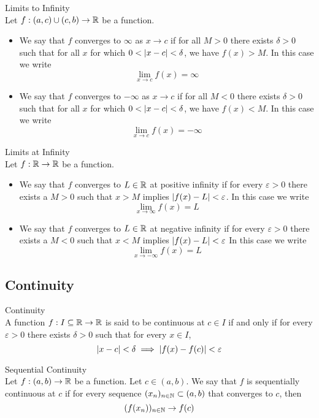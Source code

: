 \documentclass[a4paper]{article}
\begin{document}
\begin{defn}{Limits to Infinity}{}\\ Let $f:(a,c)\cup(c,b)\to\mathbb{R}$ be a function. 
\begin{itemize} 
\item We say that $f$ converges to $\infty$ as $x\to c$ if for all $M>0$ there exists $\delta>0$ such that for all $x$ for which $0<\abs{x-c}<\delta$, we have $f(x)>M$. In this case we write $$\lim_{x\to c}f(x)=\infty$$
\item We say that $f$ converges to $-\infty$ as $x\to c$ if for all $M<0$ there exists $\delta>0$ such that for all $x$ for which $0<\abs{x-c}<\delta$, we have $f(x)<M$. In this case we write $$\lim_{x\to c}f(x)=-\infty$$
\end{itemize}
\end{defn}

\begin{defn}{Limits at Infinity}{}\\ Let $f:\mathbb{R}\to\mathbb{R}$ be a function. 
\begin{itemize} 
\item We say that $f$ converges to $L\in\mathbb{R}$ at positive infinity if for every $\varepsilon>0$ there exists a $M>0$ such that $x>M$ implies $\abs{f(x)-L}<\varepsilon$. In this case we write $$\lim_{x\to\infty}f(x)=L$$
\item We say that $f$ converges to $L\in\mathbb{R}$ at negative infinity if for every $\varepsilon>0$ there exists a $M<0$ such that $x<M$ implies $\abs{f(x)-L}<\varepsilon$ In this case we write $$\lim_{x\to-\infty}f(x)=L$$
\end{itemize}
\end{defn}

\subsection{Continuity}
\begin{defn}{Continuity}{}\\ A function $f:I\subseteq\mathbb{R}\to\mathbb{R}$ is said to be continuous at $c\in I$ if and only if for every $\varepsilon>0$ there exists $\delta>0$ such that for every $x\in I$, $$\abs{x-c}<\delta\implies\abs{f(x)-f(c)}<\varepsilon$$
\end{defn}

\begin{defn}{Sequential Continuity}{}\\ Let $f:(a,b)\to\mathbb{R}$ be a function. Let $c\in (a,b)$. We say that $f$ is sequentially continuous at $c$ if for every sequence $(x_n)_{n\in\mathbb{N}}\subset(a,b)$ that converges to $c$, then $$(f(x_n))_{n\in\mathbb{N}}\to f(c)$$
\end{defn}
\end{document}
